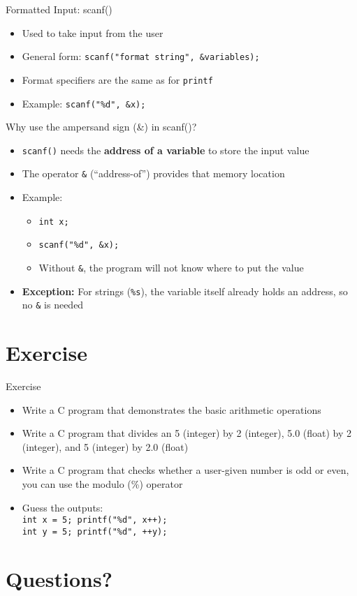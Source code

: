 \documentclass[12pt, aspectratio=169]{beamer}
\begin{document}
    \begin{frame}{Formatted Input: scanf()}
        \begin{itemize}
            \item Used to take input from the user
            \item General form: \texttt{scanf("format string", \&variables);}
            \item Format specifiers are the same as for \texttt{printf}
            \item Example: \texttt{scanf("\%d", \&x);}
        \end{itemize}
    \end{frame}


    \begin{frame}{Why use the ampersand sign (\&) in scanf()?}
        \begin{itemize}
            \item \texttt{scanf()} needs the \textbf{address of a variable} to store the input value
            \item The operator \texttt{\&} (“address-of”) provides that memory location
            \item Example:
                \begin{itemize}
                    \item \texttt{int x;}
                    \item \texttt{scanf("\%d", \&x);}  %
                    \item Without \texttt{\&}, the program will not know where to put the value
                \end{itemize}
            \item \textbf{Exception:} For strings (\texttt{\%s}), the variable itself already holds an address, so no \texttt{\&} is needed
        \end{itemize}
    \end{frame}


    \section{Exercise}

    \begin{frame}{Exercise}
        \begin{itemize}
            \item Write a C program that demonstrates the basic arithmetic operations
            \item Write a C program that divides an 5 (integer) by 2 (integer), 5.0 (float) by 2 (integer), and 5 (integer) by 2.0 (float)
            \item Write a C program that checks whether a user-given number is odd or even, you can use the modulo (\%) operator
            \item Guess the outputs:  \\
                \texttt{int x = 5; printf("\%d", x++);}  \\
                \texttt{int y = 5; printf("\%d", ++y);}
        \end{itemize}
    \end{frame}

    \section*{Questions?}
\end{document}
